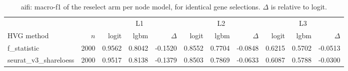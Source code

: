 \begin{table}[t]
\centering
\small
\begin{tabular}{lrrrrrrrrrr}
\toprule
 &  & \multicolumn{3}{c}{L1} & \multicolumn{3}{c}{L2} & \multicolumn{3}{c}{L3} \\
\cmidrule(lr){3-5}\cmidrule(lr){6-8}\cmidrule(lr){9-11}
HVG method & $n$ & logit & lgbm & $\Delta$ & logit & lgbm & $\Delta$ & logit & lgbm & $\Delta$ \\
\midrule
f\_statistic & 2000 & 0.9562 & 0.8042 & -0.1520 & 0.8552 & 0.7704 & -0.0848 & 0.6215 & 0.5702 & -0.0513 \\
\addlinespace
seurat\_v3\_shareloess & 2000 & 0.9517 & 0.8138 & -0.1379 & 0.8503 & 0.7869 & -0.0633 & 0.6087 & 0.5788 & -0.0300 \\
\bottomrule
\end{tabular}
\caption{aifi: macro-f1 of the reselect arm per node model, for identical gene selections. $\Delta$ is relative to logit.}
\label{tab:backend-aifi-macrof1}
\end{table}